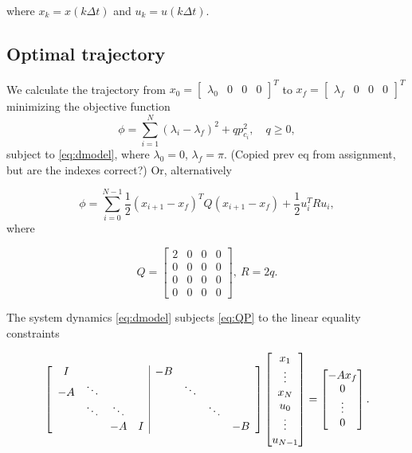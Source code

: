 where $x_k = x(k\Delta t)$ and $u_k = u(k\Delta t)$.

\subsection{Optimal trajectory}

We calculate the trajectory from $x_0 = \begin{bmatrix}\lambda_0&0&0&0\end{bmatrix}^T$ to $x_f = \begin{bmatrix}\lambda_f&0&0&0\end{bmatrix}^T$ minimizing the objective function 
\begin{equation*}
	\phi = \sum_{i=1}^{N}(\lambda_i - \lambda_f)^2 + qp^2_{c_i}, \quad q \ge 0,
\end{equation*}
subject to \eqref{eq:dmodel}, where $\lambda_0 = 0$, $\lambda_f = \pi$. (Copied prev eq from assignment, but are the indexes correct?) Or, alternatively

\begin{equation}
	\label{eq:QP}
	\phi = \sum_{i=0}^{N-1} \frac{1}{2}(x_{i+1}-x_f)^TQ(x_{i+1}-x_f) + \frac{1}{2}u_i^TRu_i,
\end{equation}
where

\begin{equation}
Q = \begin{bmatrix}2&0&0&0\\0&0&0&0\\0&0&0&0\\0&0&0&0\end{bmatrix}, \ R = 2q.
\end{equation}

The system dynamics \eqref{eq:dmodel} subjects \eqref{eq:QP} to the linear equality constraints

\begin{equation}
	\label{eq:eq_constraints}
	\left[\begin{array}{cccc | ccccc}
	I	&&&&			-B	&&&			\\
	-A	&\ddots&&&			&\ddots&&	\\
		&\ddots&\ddots&&	&&\ddots&	\\
		&& -A & I&			&&& -B		\\
	\end{array}\right]
\begin{bmatrix} x_1 \\ \vdots \\ x_N \\ u_0 \\ \vdots \\ u_{N-1} \end{bmatrix}
=
\begin{bmatrix}
-A x_f \\ 0 \\ \vdots \\ 0      
\end{bmatrix}.
\end{equation}

